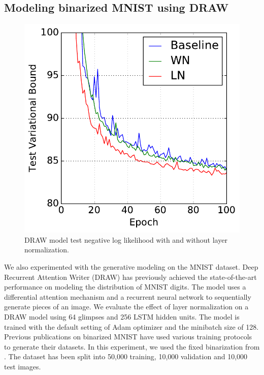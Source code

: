 \documentclass{article}
\begin{document}
\subsection{Modeling binarized MNIST using DRAW}
\begin{figure}
  \vspace{-0.25in}
  \centering
\includegraphics[width=1.0\columnwidth]{figures/draw}  
\caption{DRAW model test negative log likelihood with and without layer normalization.
\vspace{-0.15in}
}
\label{fig:draw}
\end{figure}



We also experimented with the generative modeling on the MNIST
dataset.  Deep Recurrent Attention Writer (DRAW) \citep{draw} has
previously achieved the state-of-the-art performance on modeling the
distribution of MNIST digits. The model uses a differential attention
mechanism and a recurrent neural network to sequentially generate
pieces of an image. We evaluate the effect of layer normalization
on a DRAW model using 64 glimpses and 256 LSTM hidden units. The
model is trained with the default setting of Adam \citep{adam}
optimizer and the minibatch size of 128. Previous publications on
binarized MNIST have used various training protocols to generate
their datasets. In this experiment, we used the fixed binarization
from \citet{hugobmnist}. The dataset has been split into 50,000
training, 10,000 validation and 10,000 test images.
\end{document}
